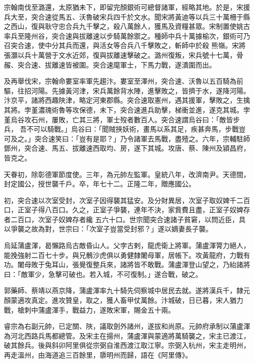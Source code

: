 \begin{pinyinscope}
 宗翰南伐至潞還，太原猶未下，即留完顏銀術可總督諸軍，經略其地。於是，宋援兵大至，突合速從馬五、沃魯破宋兵四千於文水。聞宋將黃迪等以兵三十萬柵于縣之西山，復與耿守忠合兵九千擊之，殺八萬餘人，獲馬及資糧甚眾。宋制置使姚古率兵至隆州谷，突合速與拔離速以步騎萬餘禦之。種師中兵十萬據榆次，銀術可乃召突合速，使中分其兵而還，與活女等合兵八千擊敗之，斬師中於殺
 熊嶺。宋將張灝以兵十萬營于文水近郊，復與拔離速擊破之。潞州復叛，宋兵號十七萬，骨赧、突合速、拔離速皆被圍。突合速麾軍士，下馬力戰，遂潰圍而出。



 及再舉伐宋，宗翰命婁室率軍先趨汴。婁室至澤州，突合速、沃魯以五百騎為前驅，往招河陽。先據黃河津，宋兵萬餘背水陣，進擊敗之，皆擠于水，遂降河陽。汴京平，諸將西趣陜津，略定河東郡縣。突合速取憲州，遇其援軍，擊敗之，生擒其將。孛堇濃瑰術魯等攻保德，未下，突合速進兵助擊，梯衝並進，遂克其城。孛堇烏谷攻石州，屢敗，亡其三將，軍士歿者數百人。突合速謂烏谷曰：「敵皆步兵，
 吾不可以騎戰。」烏谷曰：「聞賊挾妖術，畫馬以系其足，疾甚奔馬，步戰豈可及之。」突合速笑曰：「豈有是耶？」乃令諸軍去馬戰，盡殪之。六年，宗輔駐師鄧州，突合速、馬五、拔離速西取均、房，遂下其城。攻唐、蔡、陳州及潁昌府，皆克之。



 天眷初，除彰德軍節度使。三年，為元帥左監軍。皇統八年，改濟南尹。天德間，封定國公，授世襲千戶。卒，年七十二。正隆二年，贈應國公。



 初，突合速以次室受封，次室子因得襲其猛安。及分財異居，次室子取奴婢千二百口，正室子得八百口。久之，正室子爭襲，連年不決，家貲費且盡，正室子奴婢存者二百口，次室子奴婢存者纔
 五六十口。世宗聞突合速諸子貧窘，以問近臣，具以爭襲之故為對，世宗曰：「次室子豈當受封邪？」遂以嫡妻長子襲。



 烏延蒲盧渾，曷懶路烏古敵昏山人。父孛古剌，龍虎衛上將軍。蒲盧渾膂力絕人，能挽強射二百七十步。與兄鶻沙虎俱以勇健隸闍母軍，居帳下。攻黃龍府，力戰有功。闍母敗于兔耳山，張覺復整兵來，諸將皆不敢戰。蒲盧渾登山望之，乃紿諸將曰：「敵軍少，急擊可破也。若入城，不可復制。」遂合戰，破之。



 郭藥師、蔡靖以燕京降，蒲盧渾率九十騎先伺察城中居民去就。遂將漢兵千，隸元
 顏蒙適攻真定。進攻贊皇，取之，獲人畜甲仗萬餘。汴城破，日已暮，宋人猶力戰，槍刺中蒲盧渾手，戰益力，遂敗宋軍，賜金五十兩。



 睿宗為右副元帥，已定關、陜，議取劍外諸州，遂拔和尚原。元帥府承制以蒲盧渾為河北西路兵馬都總管。及宋主在揚州，蒲盧渾與蒙適將萬騎襲之，宋主已渡江，破其餘兵。後與斜卯阿里俱從宗弼自淮西渡江取江寧。宗弼入杭州，宋主走明州，再走溫州，由海道追三百餘里，隳明州而歸，語在《阿里傳》。




\end{pinyinscope}

